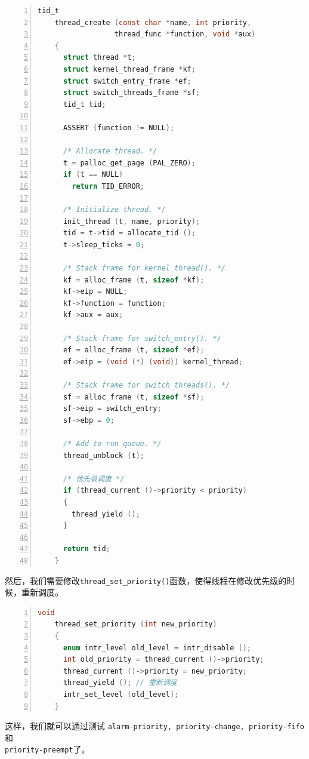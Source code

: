 \documentclass{article}
\begin{document}
\begin{lstlisting}[xleftmargin = 4em,xrightmargin = 3em, aboveskip = 1em, numbers = left, language = C, title=修改后的\texttt{thread\_create()}函数]
    tid_t
    thread_create (const char *name, int priority,
                  thread_func *function, void *aux) 
    {
      struct thread *t;
      struct kernel_thread_frame *kf;
      struct switch_entry_frame *ef;
      struct switch_threads_frame *sf;
      tid_t tid;
    
      ASSERT (function != NULL);
    
      /* Allocate thread. */
      t = palloc_get_page (PAL_ZERO);
      if (t == NULL)
        return TID_ERROR;
    
      /* Initialize thread. */
      init_thread (t, name, priority);
      tid = t->tid = allocate_tid ();
      t->sleep_ticks = 0;
    
      /* Stack frame for kernel_thread(). */
      kf = alloc_frame (t, sizeof *kf);
      kf->eip = NULL;
      kf->function = function;
      kf->aux = aux;
    
      /* Stack frame for switch_entry(). */
      ef = alloc_frame (t, sizeof *ef);
      ef->eip = (void (*) (void)) kernel_thread;
    
      /* Stack frame for switch_threads(). */
      sf = alloc_frame (t, sizeof *sf);
      sf->eip = switch_entry;
      sf->ebp = 0;
    
      /* Add to run queue. */
      thread_unblock (t);
    
      /* 优先级调度 */
      if (thread_current ()->priority < priority)
      {
        thread_yield ();
      }
    
      return tid;
    }
\end{lstlisting}

然后，我们需要修改\texttt{thread\_set\_priority()}函数，使得线程在修改优先级的时候，重新调度。

\begin{lstlisting}[xleftmargin = 4em,xrightmargin = 3em, aboveskip = 1em, numbers = left, language = C, title=修改后的\texttt{thread\_set\_priority()}函数]
    void
    thread_set_priority (int new_priority) 
    {
      enum intr_level old_level = intr_disable ();
      int old_priority = thread_current ()->priority;
      thread_current ()->priority = new_priority;
      thread_yield (); // 重新调度
      intr_set_level (old_level);
    }
\end{lstlisting}

这样，我们就可以通过测试 \texttt{alarm-priority, priority-change, priority-fifo}和\\ \texttt{priority-preempt}了。
\end{document}
